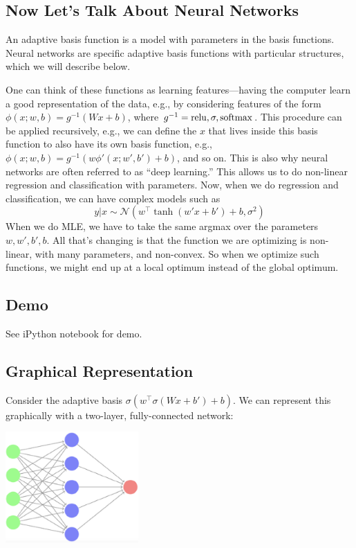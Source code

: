 \documentclass{article}
\begin{document}
\subsection{Now Let's Talk About Neural Networks}

An adaptive basis function is a model with parameters in the basis functions. Neural networks are specific adaptive basis functions with particular structures, which we will describe below.

One can think of these functions as learning features---having the computer learn a good representation of the data, e.g., by considering features of the form $\phi(x; w, b) = g^{-1}(Wx + b)$, where $g^{-1} = \operatorname{relu}, \sigma, \operatorname{softmax}$. This procedure can be applied recursively, e.g., we can define the $x$ that lives inside this basis function to also have its own basis function, e.g., $\phi(x; w, b) = g^{-1}(w\phi'(x; w', b') + b)$, and so on. This is also why neural networks are often referred to as ``deep learning.'' This allows us to do non-linear regression and classification with parameters. Now, when we do regression and classification, we can have complex models such as
$$y | x \sim \mathcal{N}(w^\top\tanh(w'x + b') + b, \sigma^2)$$
When we do MLE, we have to take the same argmax over the parameters $w, w', b', b$. All that's changing is that the function we are optimizing is non-linear, with many parameters, and non-convex. So when we optimize such functions, we might end up at a local optimum instead of the global optimum.

\subsection{Demo}

See iPython notebook for demo.

\subsection{Graphical Representation}

Consider the adaptive basis $\sigma(w^\top \sigma(Wx + b') + b)$. We can represent this graphically with a two-layer, fully-connected network:

\begin{center}
    \includegraphics[width=2in]{neural-network.png}
\end{center}
\end{document}
